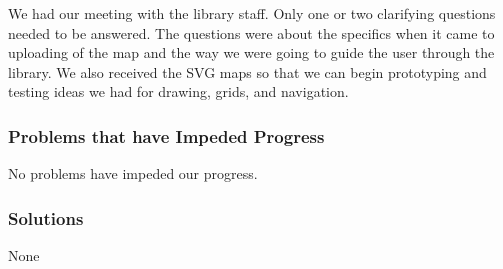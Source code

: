 \documentclass[letterpaper,10pt,titlepage, onecolumn, compsoc]{IEEEtran}
\begin{document}
We had our meeting with the library staff. Only one or two clarifying questions needed to be answered. The questions were about the specifics when it came to uploading of the map and the way we were going to guide the user through the library. We also received the SVG maps so that we can begin prototyping and testing  ideas we had for drawing, grids, and navigation. 

\subsubsection{Problems that have Impeded Progress}
No problems have impeded our progress.


\subsubsection{Solutions}
None

\end{document}

